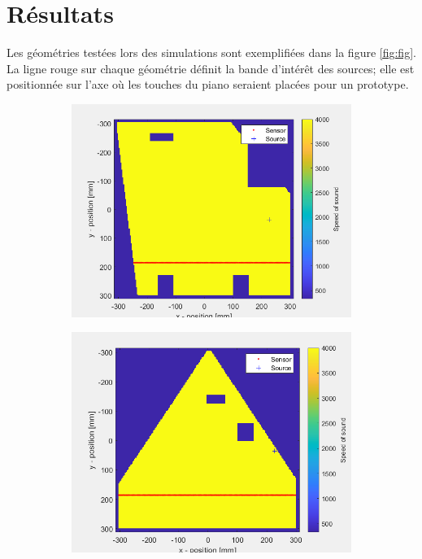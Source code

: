 \documentclass[conference]{IEEEtran}
\begin{document}
\section{Résultats}
Les géométries testées lors des simulations sont exemplifiées dans la figure \ref{fig:fig}. La ligne rouge
sur chaque géométrie définit la bande d'intérêt des sources; elle est positionnée
sur l'axe où les touches du piano seraient placées pour un prototype.
\begin{figure}[H]
  \begin{subfigure}{.155\textwidth}
    \centering
    \includegraphics[width=.95\linewidth]{forme1.png}
    \caption{}
    \label{fig:sfig1}
  \end{subfigure}%
  \begin{subfigure}{.155\textwidth}
    \centering
    \includegraphics[width=.95\linewidth]{forme2.png}

\end{subfigure}
\end{figure}
\end{document}
